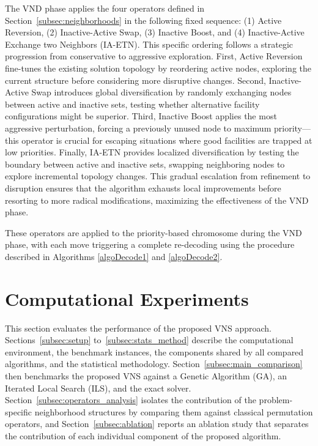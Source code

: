 \documentclass[preprint,12pt,authoryear]{elsarticle}
\begin{document}
The VND phase applies the four operators defined in Section~\ref{subsec:neighborhoods} in the following fixed sequence: (1) Active Reversion, (2) Inactive-Active Swap, (3) Inactive Boost,
and (4) Inactive-Active Exchange two Neighbors (IA-ETN). This specific ordering follows a strategic progression from conservative to aggressive exploration. First, Active Reversion fine-tunes the existing solution topology by reordering active nodes, 
exploring the current structure before considering more disruptive changes. Second, Inactive-Active Swap introduces global diversification by randomly exchanging nodes between 
active and inactive sets, testing whether alternative facility configurations might be superior. Third, Inactive Boost applies the most aggressive perturbation, forcing a previously unused node 
to maximum priority—this operator is crucial for escaping situations where good facilities are trapped at low priorities. Finally, IA-ETN provides localized diversification by testing the boundary 
between active and inactive sets, swapping neighboring nodes to explore incremental topology changes. This gradual escalation from refinement to disruption ensures that the algorithm exhausts 
local improvements before resorting to more radical modifications, maximizing the effectiveness of the VND phase.

These operators are applied to the priority-based chromosome during the VND phase, with each move triggering a complete re-decoding using the procedure described in 
Algorithms \ref{algoDecode1} and \ref{algoDecode2}.


\section{Computational Experiments}
\label{sec:experiments}

This section evaluates the performance of the proposed VNS approach. Sections~\ref{subsec:setup} to~\ref{subsec:stats_method} describe the computational environment, the
benchmark instances, the components shared by all compared algorithms, and the statistical methodology. Section~\ref{subsec:main_comparison} then benchmarks the proposed VNS
against a Genetic Algorithm (GA), an Iterated Local Search (ILS), and the exact solver. Section~\ref{subsec:operators_analysis} isolates the contribution of the problem-specific
neighborhood structures by comparing them against classical permutation operators, and Section~\ref{subsec:ablation} reports an ablation study that separates the contribution
of each individual component of the proposed algorithm.
\end{document}
